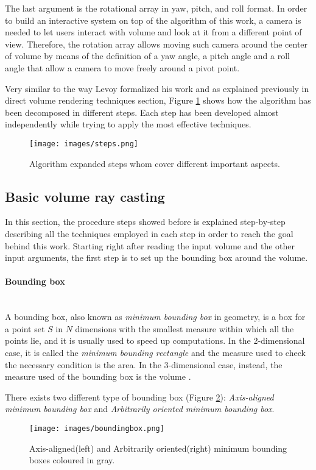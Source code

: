 \documentclass[12pt,a4paper]{extarticle}
\newcommand{\linespace}{\vspace{0pt}}
\newcommand{\myparagraph}[1]{\paragraph{#1}\mbox{}\\}
\begin{document}
The last argument is the rotational array in yaw, pitch, and roll format. In order to build an interactive system on top of the algorithm of this work, a camera is needed to let users interact with volume and look at it from a different point of view. Therefore, the rotation array allows moving such camera around the center of volume by means of the definition of a yaw angle, a pitch angle and a roll angle that allow a camera to move freely around a pivot point.
\linespace

Very similar to the way Levoy formalized his work and as explained previously in direct volume rendering techniques section,
Figure \ref{fig:steps} shows how the algorithm has been decomposed in different steps. Each step has been developed almost independently while trying to apply the most effective techniques.


\begin{figure}[hbtp]
\centering
\texttt{[image: images/steps.png]}
\caption{Algorithm expanded steps whom cover different important aspects.}
\label{fig:steps}
\end{figure}

\subsection{Basic volume ray casting} 
In this section, the procedure steps showed before is explained step-by-step describing all the techniques employed in each step in order to reach the goal behind this work.
Starting right after reading the input volume and the other input arguments, the first step is to set up the bounding box around the volume.

\myparagraph{Bounding box}
A bounding box, also known as \textit{minimum bounding box} in geometry, is a box for a point set $S$ in $N$ dimensions with the smallest measure within which all the points lie, and it is usually used to speed up computations. In the 2-dimensional case, it is called the \textit{minimum bounding rectangle} and the measure used to check the necessary condition is the area. In the 3-dimensional case, instead, the measure used of the bounding box is the volume \cite{wiki_min_bound:1}.
\linespace

There exists two different type of bounding box (Figure \ref{fig:boundingbox}): \textit{Axis-aligned minimum bounding box} and \textit{Arbitrarily oriented minimum bounding box}.

\begin{figure}[hbtp]
\centering
\texttt{[image: images/boundingbox.png]}
\caption{Axis-aligned(left) and Arbitrarily oriented(right) minimum bounding boxes coloured in gray.}
\label{fig:boundingbox}
\end{figure}
\end{document}
